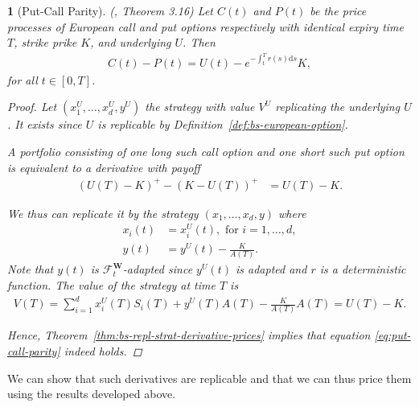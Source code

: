 \documentclass[english]{article}
\numberwithin{equation}{section}
\numberwithin{figure}{section}
\theoremstyle{bolddescit}
\newtheorem{theorem}{\protect\theoremname}[section]
\theoremstyle{definition}
\theoremstyle{definition}
\theoremstyle{plain}
\theoremstyle{plain}
\theoremstyle{bolddesc}
\theoremstyle{plain}
\theoremstyle{remark}
\providecommand{\theoremname}{Theorem}
\begin{document}
\begin{theorem}[Put-Call Parity]\label{thm:put-call-parity}
  (\cite{capinski_blackscholes_2012}, Theorem 3.16)
  Let $C(t)$ and $P(t)$ be the price processes of European call and put options respectively with identical expiry time $T$, strike prike $K$, and underlying $U$. Then
  \begin{align}\label{eq:put-call-parity}
    C(t) - P(t) = U(t) - e^{-\int_t^T r(s) \mathrm{d}s} K,
  \end{align}
  for all $t \in [0,T]$.

  \begin{proof}
    Let $(x_1^U,\ldots,x_d^U,y^U)$ the strategy with value $V^U$ replicating the underlying $U$. It exists since $U$ is replicable by Definition~\ref{def:bs-european-option}.

    A portfolio consisting of one long such call option and one short such put option is equivalent to a derivative with payoff
    \begin{align*}
      (U(T) - K)^+ - (K - U(T))^+
      &= U(T) - K.
    \end{align*}

    We thus can replicate it by the strategy $(x_1,\ldots,x_d,y)$ where
    \begin{align*}
      x_i(t) &= x_i^U(t), \text{ for } i=1,\ldots,d,\\
      y(t) &= y^U(t) - \frac{K}{A(T)}.
    \end{align*}
    Note that $y(t)$ is $\mathcal{F}^\mathbf{W}_t$-adapted since $y^U(t)$ is adapted and $r$ is a deterministic function. The value of the strategy at time $T$ is
    \begin{align*}
      V(T) = \sum_{i=1}^d x_i^U(T) S_i(T) + y^U(T) A(T) - \frac{K}{A(T)} A(T)
      = U(T) - K.
    \end{align*}

    Hence, Theorem~\ref{thm:bs-repl-strat-derivative-prices} implies that equation \eqref{eq:put-call-parity} indeed holds.
  \end{proof}
\end{theorem}

We can show that such derivatives are replicable and that we can thus price them using the results developed above.
\end{document}
